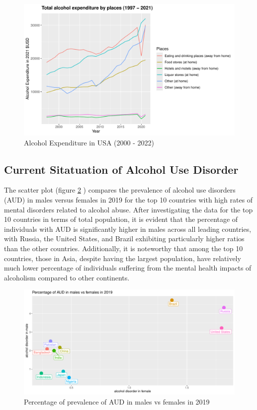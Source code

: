 \documentclass[11pt,a4paper,]{article}
\begin{document}
\begin{figure}

{\centering \includegraphics[width=0.7\linewidth]{alcohol_analysis_files/figure-latex/US-alcohol-exp-1} 

}

\caption{Alcohol Expenditure in USA (2000 - 2022)}\label{fig:US-alcohol-exp}
\end{figure}
\pagebreak

\subsection{Current Sitatuation of Alcohol Use Disorder}\label{current-sitatuation-of-alcohol-use-disorder}

The scatter plot (figure \ref{fig:top10} ) compares the prevalence of alcohol use disorders (AUD) in males versus females in 2019 for the top 10 countries with high rates of mental disorders related to alcohol abuse.
After investigating the data for the top 10 countries in terms of total population, it is evident that the percentage of individuals with AUD is significantly higher in males across all leading countries, with Russia, the United States, and Brazil exhibiting particularly higher ratios than the other countries.
Additionally, it is noteworthy that among the top 10 countries, those in Asia, despite having the largest population, have relatively much lower percentage of individuals suffering from the mental health impacts of alcoholism compared to other continents.

\begin{figure}

{\centering \includegraphics[width=0.7\linewidth]{alcohol_analysis_files/figure-latex/top10-1} 

}

\caption{Percentage of prevalence of AUD in males vs females in 2019}\label{fig:top10}
\end{figure}
\end{document}
